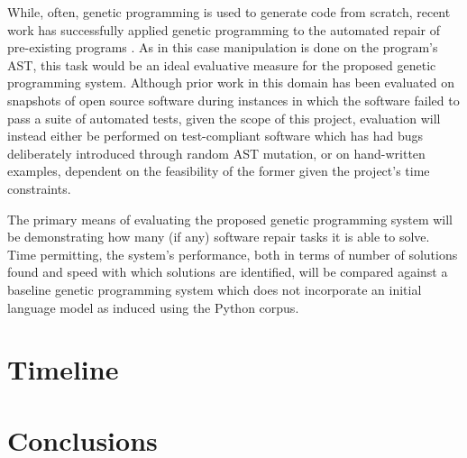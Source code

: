 \documentclass[a4paper,11pt]{proposal}
\begin{document}
While, often, genetic programming is used to generate code from scratch, recent work has successfully applied genetic programming to the automated repair of pre-existing programs \cite{weimer2009}. As in this case manipulation is done on the program's AST, this task would be an ideal evaluative measure for the proposed genetic programming system. Although prior work in this domain has been evaluated on snapshots of open source software during instances in which the software failed to pass a suite of automated tests, given the scope of this project, evaluation will instead either be performed on test-compliant software which has had bugs deliberately introduced through random AST mutation, or on hand-written examples, dependent on the feasibility of the former given the project's time constraints.

The primary means of evaluating the proposed genetic programming system will be demonstrating how many (if any) software repair tasks it is able to solve. Time permitting, the system's performance, both in terms of number of solutions found and speed with which solutions are identified, will be compared against a baseline genetic programming system which does not incorporate an initial language model as induced using the Python corpus.


\section{Timeline}

\section{Conclusions}

\newpage


\end{document}
